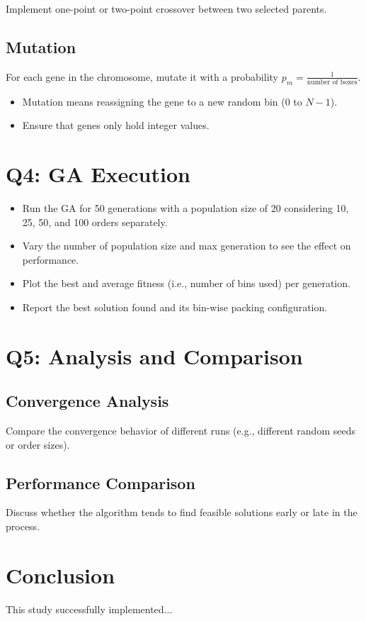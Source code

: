 \documentclass[journal,12pt,onecolumn]{IEEEtran}
\begin{document}
Implement one-point or two-point crossover between two selected parents.

\subsection{Mutation}

For each gene in the chromosome, mutate it with a probability $p_m = \frac{1}{\text{number of boxes}}$.

\begin{itemize}
    \item Mutation means reassigning the gene to a new random bin (0 to $N-1$).
    \item Ensure that genes only hold integer values.
\end{itemize}

\section{Q4: GA Execution}

\begin{itemize}
    \item Run the GA for 50 generations with a population size of 20 considering 10, 25, 50, and 100 orders separately.
    \item Vary the number of population size and max generation to see the effect on performance.
    \item Plot the best and average fitness (i.e., number of bins used) per generation.
    \item Report the best solution found and its bin-wise packing configuration.
\end{itemize}

\section{Q5: Analysis and Comparison}

\subsection{Convergence Analysis}

Compare the convergence behavior of different runs (e.g., different random seeds or order sizes).

\subsection{Performance Comparison}

Discuss whether the algorithm tends to find feasible solutions early or late in the process.

\section{Conclusion}
This study successfully implemented...
\end{document}
